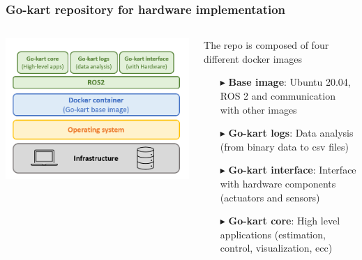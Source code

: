 \documentclass[9pt, aspectratio=169]{beamer}
\begin{document}
\begin{frame}
\frametitle{Go-kart repository for hardware implementation}
\begin{columns}
\begin{column}{0.35\textwidth}
	\begin{center}
  		\includegraphics[width=1\textwidth]{Repo}
	\end{center}
\end{column}
\begin{column}{0.7\textwidth}
\centering
The repo is composed of four different docker images
\vspace{0.2cm}
\begin{itemize}
	\footnotesize
	\item[$\blacktriangleright$] \textbf{Base image}: Ubuntu 20.04, ROS 2 and communication with other images
	\item[$\blacktriangleright$] \textbf{Go-kart logs}: Data analysis (from binary data to csv files)	
	\item[$\blacktriangleright$] \textbf{Go-kart interface}: Interface with hardware components (actuators and sensors)
	\item[$\blacktriangleright$] \textbf{Go-kart core}: High level applications (estimation, control, visualization, ecc)
\end{itemize}
\end{column}
\end{columns}

\begin{columns}
\begin{column}{0.6\textwidth}


\end{column}
\end{columns}
\end{frame}
\end{document}

